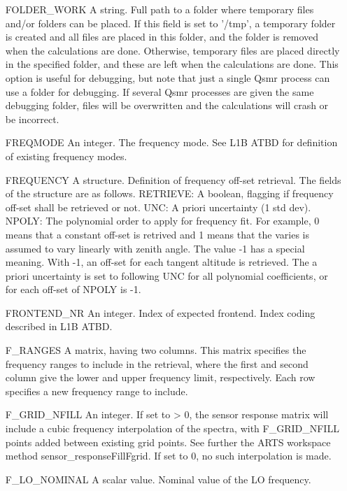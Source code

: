 \begin{changemargin}{2.5cm}{0.0cm}
\begin{itemize}
\item[{FOLDER\_WORK}] 
A string. Full path to a folder where temporary files and/or folders can
be placed. If this field is set to '/tmp', a temporary folder is created and
all files are placed in this folder, and the folder is removed when the
calculations are done. Otherwise, temporary files are placed directly in the
specified folder, and these are left when the calculations are done. This
option is useful for debugging, but note that just a single Qsmr process can
use a folder for debugging. If several Qsmr processes are given the same debugging
folder, files will be overwritten and the calculations will crash or be incorrect.

\item[{FREQMODE}] 
An integer. The frequency mode. See L1B ATBD for definition of existing
frequency modes.

\item[{FREQUENCY}] 
A structure. Definition of frequency off-set retrieval. The fields of the
structure are as follows. RETRIEVE: A boolean, flagging if frequency off-set
shall be retrieved or not. UNC: A priori uncertainty (1 std dev). NPOLY: The
polynomial order to apply for frequency fit. For example, 0 means that a
constant off-set is retrived and 1 means that the varies is assumed to vary
linearly with zenith angle. The value -1 has a special meaning. With -1, an
off-set for each tangent altitude is retrieved. The a priori uncertainty is
set to following UNC for all polynomial coefficients, or for each off-set
of NPOLY is -1.

\item[{FRONTEND\_NR}] 
An integer. Index of expected frontend. Index coding described in L1B ATBD.

\item[{F\_RANGES}] 
A matrix, having two columns. This matrix specifies the frequency ranges to
include in the retrieval, where the first and second column give the lower
and upper frequency limit, respectively. Each row specifies a new frequency
range to include.

\item[{F\_GRID\_NFILL}] 
An integer. If set to > 0, the sensor response matrix will include a cubic
frequency interpolation of the spectra, with F\_GRID\_NFILL points added
between existing grid points. See further the ARTS workspace method
sensor\_responseFillFgrid. If set to 0, no such interpolation is made.

\item[{F\_LO\_NOMINAL}] 
A scalar value. Nominal value of the LO frequency.


\end{itemize}
\end{changemargin}
